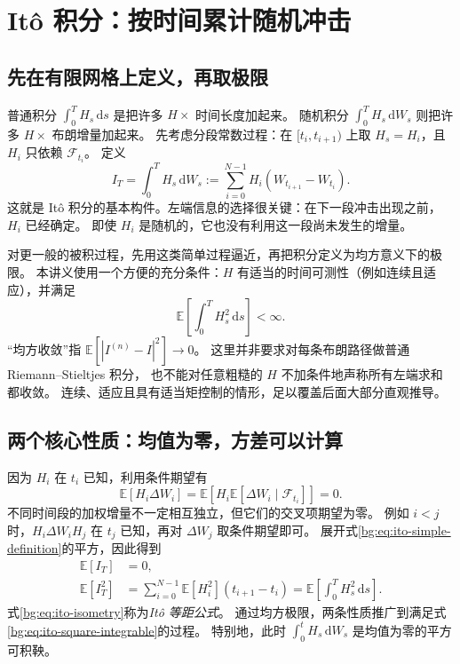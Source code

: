 \documentclass[11pt,a4paper,fontset=none]{ctexart}
\numberwithin{equation}{section}
\newcommand{\E}{\mathbb E}
\begin{document}
\section{It\^o 积分：按时间累计随机冲击}
\label{bg:sec:ito-integral}

\subsection{先在有限网格上定义，再取极限}
\label{bg:sub:left-sum}

普通积分 $\int_0^T H_s\,\mathrm ds$ 是把许多 $H\times$ 时间长度加起来。
随机积分 $\int_0^T H_s\,\mathrm dW_s$ 则把许多 $H\times$ 布朗增量加起来。
先考虑分段常数过程：在 $[t_i,t_{i+1})$ 上取 $H_s=H_i$，且 $H_i$ 只依赖 $\mathcal F_{t_i}$。
定义
\begin{equation}
  I_T=\int_0^T H_s\,\mathrm dW_s
  :=\sum_{i=0}^{N-1}H_i(W_{t_{i+1}}-W_{t_i}).
  \label{bg:eq:ito-simple-definition}
\end{equation}
这就是 It\^o 积分的基本构件。左端信息的选择很关键：在下一段冲击出现之前，$H_i$ 已经确定。
即使 $H_i$ 是随机的，它也没有利用这一段尚未发生的增量。

对更一般的被积过程，先用这类简单过程逼近，再把积分定义为均方意义下的极限。
本讲义使用一个方便的充分条件：$H$ 有适当的时间可测性（例如连续且适应），并满足
\begin{equation}
  \E\!\left[\int_0^T H_s^2\,\mathrm ds\right]<\infty.
  \label{bg:eq:ito-square-integrable}
\end{equation}
“均方收敛”指 $\E[|I^{(n)}-I|^2]\to0$。
这里并非要求对每条布朗路径做普通 Riemann--Stieltjes 积分，
也不能对任意粗糙的 $H$ 不加条件地声称所有左端求和都收敛。
连续、适应且具有适当矩控制的情形，足以覆盖后面大部分直观推导。

\subsection{两个核心性质：均值为零，方差可以计算}
\label{bg:sub:isometry}

因为 $H_i$ 在 $t_i$ 已知，利用条件期望有
\begin{equation}
  \E[H_i\Delta W_i]
  =\E\!\left[H_i\E[\Delta W_i\mid\mathcal F_{t_i}]\right]=0.
  \label{bg:eq:zero-mean-step}
\end{equation}
不同时间段的加权增量不一定相互独立，但它们的交叉项期望为零。
例如 $i<j$ 时，$H_i\Delta W_i H_j$ 在 $t_j$ 已知，再对 $\Delta W_j$ 取条件期望即可。
展开式\eqref{bg:eq:ito-simple-definition}的平方，因此得到
\begin{align}
  \E[I_T]&=0,\label{bg:eq:ito-mean}\\
  \E[I_T^2]
  &=\sum_{i=0}^{N-1}\E[H_i^2](t_{i+1}-t_i)
   =\E\!\left[\int_0^T H_s^2\,\mathrm ds\right].
  \label{bg:eq:ito-isometry}
\end{align}
式\eqref{bg:eq:ito-isometry}称为\emph{It\^o 等距公式}。
通过均方极限，两条性质推广到满足式\eqref{bg:eq:ito-square-integrable}的过程。
特别地，此时 $\int_0^t H_s\,\mathrm dW_s$ 是均值为零的平方可积鞅。
\end{document}

